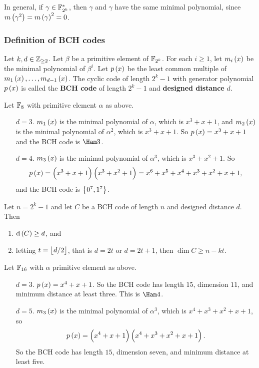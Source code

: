 \begin{note*}
In general, if $ \gamma \in \mathbb{F}_{2^k}^* $, then $ \gamma $ and $ \gamma $ have the same minimal polynomial, since $ m\br{\gamma^2} = m\br{\gamma}^2 = 0 $.
\end{note*}

\subsubsection{Definition of BCH codes}

Let $ k, d \in \mathbb{Z}_{\ge 2} $. Let $ \beta $ be a primitive element of $ \mathbb{F}_{2^k} $. For each $ i \ge 1 $, let $ m_i\br{x} $ be the minimal polynomial of $ \beta^i $. Let $ p\br{x} $ be the least common multiple of $ m_1\br{x}, \dots, m_{d - 1}\br{x} $. The cyclic code of length $ 2^k - 1 $ with generator polynomial $ p\br{x} $ is called the \textbf{BCH code} of length $ 2^k - 1 $ and \textbf{designed distance} $ d $.

\begin{example*}
Let $ \mathbb{F}_8 $ with primitive element $ \alpha $ as above.
\begin{itemize}
\item[$ d = 3 $.] $ m_1\br{x} $ is the minimal polynomial of $ \alpha $, which is $ x^3 + x + 1 $, and $ m_2\br{x} $ is the minimal polynomial of $ \alpha^2 $, which is $ x^3 + x + 1 $. So $ p\br{x} = x^3 + x + 1 $ and the BCH code is $ \Ham 3 $.
\item[$ d = 4 $.] $ m_3\br{x} $ is the minimal polynomial of $ \alpha^3 $, which is $ x^3 + x^2 + 1 $. So
$$ p\br{x} = \br{x^3 + x + 1}\br{x^3 + x^2 + 1} = x^6 + x^5 + x^4 + x^3 + x^2 + x + 1, $$
and the BCH code is $ \cbr{0^7, 1^7} $.
\end{itemize}
\end{example*}

\pagebreak

\begin{theorem}
\label{thm:1.32}
Let $ n = 2^k - 1 $ and let $ C $ be a BCH code of length $ n $ and designed distance $ d $. Then
\begin{enumerate}
\item $ \d\br{C} \ge d $, and
\item letting $ t = \left\lfloor d / 2 \right\rfloor $, that is $ d = 2t $ or $ d = 2t + 1 $, then $ \dim C \ge n - kt $.
\end{enumerate}
\end{theorem}

\begin{example*}
Let $ \mathbb{F}_{16} $ with $ \alpha $ primitive element as above.
\begin{itemize}
\item[$ d = 3 $.] $ p\br{x} = x^4 + x + 1 $. So the BCH code has length $ 15 $, dimension $ 11 $, and minimum distance at least three. This is $ \Ham 4 $.
\item[$ d = 5 $.] $ m_3\br{x} $ is the minimal polynomial of $ \alpha^3 $, which is $ x^4 + x^3 + x^2 + x + 1 $, so
$$ p\br{x} = \br{x^4 + x + 1}\br{x^4 + x^3 + x^2 + x + 1}. $$
So the BCH code has length $ 15 $, dimension seven, and minimum distance at least five.
\end{itemize}
\end{example*}

